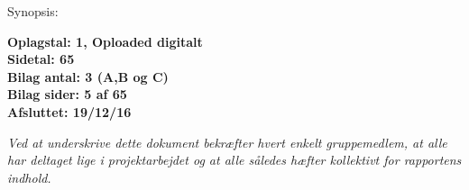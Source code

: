 \hfill
\begin{minipage}[t]{0.483\textwidth}
Synopsis: \\[5pt]
\fbox{\parbox{7cm}{\bigskip\bigskip}}

\vspace*{3cm}

\textbf{Oplagstal: 1, Oploaded digitalt} \\
\textbf{Sidetal: 65} \\
\textbf{Bilag antal: 3 (A,B og C)} \\
\textbf{Bilag sider: 5 af 65} \\
\textbf{Afsluttet: 19/12/16}

\end{minipage}
\footnotesize\itshape Ved at underskrive dette dokument bekræfter hvert enkelt gruppemedlem, at alle har deltaget lige i projektarbejdet og at alle således hæfter kollektivt for rapportens indhold.


\vfill



